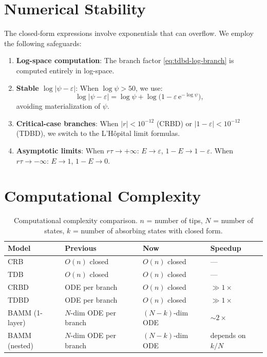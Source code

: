 \documentclass[11pt,a4paper]{article}
\newcommand{\ee}{\mathrm{e}}
\newcommand{\eps}{\varepsilon}
\theoremstyle{plain}
\theoremstyle{definition}
\theoremstyle{remark}
\begin{document}
\section{Numerical Stability}
\label{sec:stability}

The closed-form expressions involve exponentials that can overflow.
We employ the following safeguards:

\begin{enumerate}[nosep]
\item \textbf{Log-space computation}: The branch factor \eqref{eq:tdbd-log-branch} is computed entirely in log-space.

\item \textbf{Stable $\log|\psi - \eps|$}: When $\log\psi > 50$, we use:
\[
  \log|\psi - \eps| = \log\psi + \log\!\bigl(1 - \eps\,\ee^{-\log\psi}\bigr),
\]
avoiding materialization of $\psi$.

\item \textbf{Critical-case branches}: When $|r| < 10^{-12}$ (CRBD) or $|1-\eps| < 10^{-12}$ (TDBD), we switch to the L'H\^opital limit formulas.

\item \textbf{Asymptotic limits}: When $r\tau \to +\infty$: $E \to \eps$, $1-E \to 1-\eps$. When $r\tau \to -\infty$: $E \to 1$, $1-E \to 0$.
\end{enumerate}

\section{Computational Complexity}
\label{sec:complexity}

\begin{table}[h]
\centering
\begin{tabular}{@{}llll@{}}
\toprule
\textbf{Model} & \textbf{Previous} & \textbf{Now} & \textbf{Speedup} \\
\midrule
CRB & $O(n)$ closed & $O(n)$ closed & --- \\
TDB & $O(n)$ closed & $O(n)$ closed & --- \\
CRBD & ODE per branch & $O(n)$ closed & $\gg 1\times$ \\
TDBD & ODE per branch & $O(n)$ closed & $\gg 1\times$ \\
BAMM (1-layer) & $N$-dim ODE per branch & $(N\!-\!k)$-dim ODE & $\sim 2\times$ \\
BAMM (nested) & $N$-dim ODE per branch & $(N\!-\!k)$-dim ODE & depends on $k/N$ \\
\bottomrule
\end{tabular}
\caption{Computational complexity comparison. $n$ = number of tips, $N$ = number of states, $k$ = number of absorbing states with closed form.}
\label{tab:complexity}
\end{table}
\end{document}
